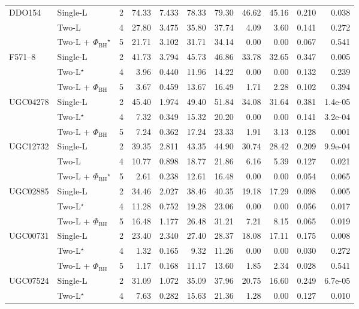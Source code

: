 \documentclass[9pt]{extarticle}
\begin{document}
{\begin{longtable}{llrrrrrrrrr}
\midrule
DDO154 & Single-L & 2 & 74.33 & 7.433 & 78.33 & 79.30 & 46.62 & 45.16 & 0.210 & 0.038\\
 & Two-L & 4 & 27.80 & 3.475 & 35.80 & 37.74 & 4.09 & 3.60 & 0.141 & 0.272\\
 & Two-L + $\Phi_\mathrm{BH}$$^\star$ & 5 & 21.71 & 3.102 & 31.71 & 34.14 & 0.00 & 0.00 & 0.067 & 0.541\\
\midrule
F571--8 & Single-L & 2 & 41.73 & 3.794 & 45.73 & 46.86 & 33.78 & 32.65 & 0.347 & 0.005\\
 & Two-L$^\star$ & 4 & 3.96 & 0.440 & 11.96 & 14.22 & 0.00 & 0.00 & 0.132 & 0.239\\
 & Two-L + $\Phi_\mathrm{BH}$ & 5 & 3.67 & 0.459 & 13.67 & 16.49 & 1.71 & 2.28 & 0.102 & 0.394\\
\midrule
UGC04278 & Single-L & 2 & 45.40 & 1.974 & 49.40 & 51.84 & 34.08 & 31.64 & 0.381 & 1.4e-05\\
 & Two-L$^\star$ & 4 & 7.32 & 0.349 & 15.32 & 20.20 & 0.00 & 0.00 & 0.141 & 3.2e-04\\
 & Two-L + $\Phi_\mathrm{BH}$ & 5 & 7.24 & 0.362 & 17.24 & 23.33 & 1.91 & 3.13 & 0.128 & 0.001\\
\midrule
UGC12732 & Single-L & 2 & 39.35 & 2.811 & 43.35 & 44.90 & 30.74 & 28.42 & 0.209 & 9.9e-04\\
 & Two-L & 4 & 10.77 & 0.898 & 18.77 & 21.86 & 6.16 & 5.39 & 0.127 & 0.021\\
 & Two-L + $\Phi_\mathrm{BH}$$^\star$ & 5 & 2.61 & 0.238 & 12.61 & 16.48 & 0.00 & 0.00 & 0.054 & 0.065\\
\midrule
UGC02885 & Single-L & 2 & 34.46 & 2.027 & 38.46 & 40.35 & 19.18 & 17.29 & 0.098 & 0.005\\
 & Two-L$^\star$ & 4 & 11.28 & 0.752 & 19.28 & 23.06 & 0.00 & 0.00 & 0.056 & 0.017\\
 & Two-L + $\Phi_\mathrm{BH}$ & 5 & 16.48 & 1.177 & 26.48 & 31.21 & 7.21 & 8.15 & 0.065 & 0.019\\
\midrule
UGC00731 & Single-L & 2 & 23.40 & 2.340 & 27.40 & 28.37 & 18.08 & 17.11 & 0.175 & 0.008\\
 & Two-L$^\star$ & 4 & 1.32 & 0.165 & 9.32 & 11.26 & 0.00 & 0.00 & 0.030 & 0.272\\
 & Two-L + $\Phi_\mathrm{BH}$ & 5 & 1.17 & 0.168 & 11.17 & 13.60 & 1.85 & 2.34 & 0.028 & 0.541\\
\midrule
UGC07524 & Single-L & 2 & 31.09 & 1.072 & 35.09 & 37.96 & 20.75 & 16.60 & 0.249 & 6.7e-05\\
 & Two-L$^\star$ & 4 & 7.63 & 0.282 & 15.63 & 21.36 & 1.28 & 0.00 & 0.127 & 0.010\\

\end{longtable}}
\end{document}
